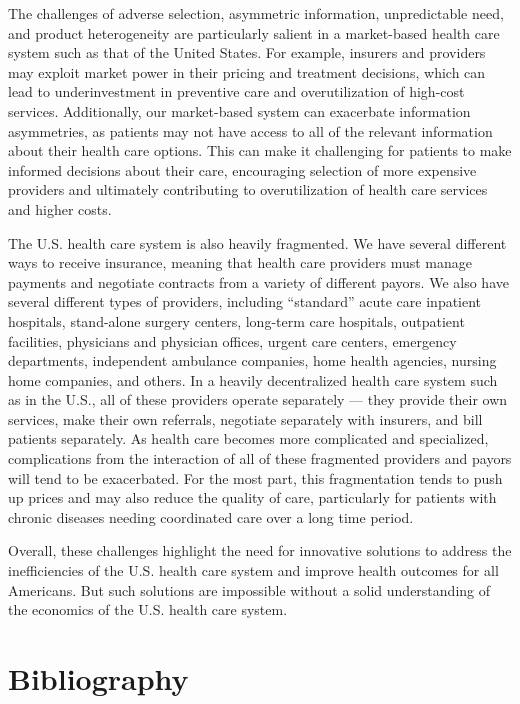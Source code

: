 \documentclass[
  letterpaper,
  DIV=11,
  numbers=noendperiod]{scrreport}
\theoremstyle{definition}
\theoremstyle{remark}
\begin{document}

The challenges of adverse selection, asymmetric information,
unpredictable need, and product heterogeneity are particularly salient
in a market-based health care system such as that of the United States.
For example, insurers and providers may exploit market power in their
pricing and treatment decisions, which can lead to underinvestment in
preventive care and overutilization of high-cost services. Additionally,
our market-based system can exacerbate information asymmetries, as
patients may not have access to all of the relevant information about
their health care options. This can make it challenging for patients to
make informed decisions about their care, encouraging selection of more
expensive providers and ultimately contributing to overutilization of
health care services and higher costs.

The U.S. health care system is also heavily fragmented. We have several
different ways to receive insurance, meaning that health care providers
must manage payments and negotiate contracts from a variety of different
payors. We also have several different types of providers, including
``standard'' acute care inpatient hospitals, stand-alone surgery
centers, long-term care hospitals, outpatient facilities, physicians and
physician offices, urgent care centers, emergency departments,
independent ambulance companies, home health agencies, nursing home
companies, and others. In a heavily decentralized health care system
such as in the U.S., all of these providers operate separately --- they
provide their own services, make their own referrals, negotiate
separately with insurers, and bill patients separately. As health care
becomes more complicated and specialized, complications from the
interaction of all of these fragmented providers and payors will tend to
be exacerbated. For the most part, this fragmentation tends to push up
prices and may also reduce the quality of care, particularly for
patients with chronic diseases needing coordinated care over a long time
period.

Overall, these challenges highlight the need for innovative solutions to
address the inefficiencies of the U.S. health care system and improve
health outcomes for all Americans. But such solutions are impossible
without a solid understanding of the economics of the U.S. health care
system.

\hypertarget{bibliography}{%
\section*{Bibliography}\label{bibliography}}
\end{document}
